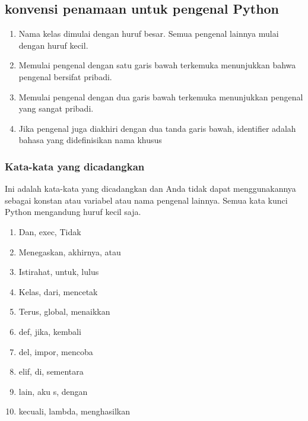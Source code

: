 \subsection{konvensi penamaan untuk pengenal Python}
\begin{enumerate}
    \item Nama kelas dimulai dengan huruf besar. Semua pengenal lainnya mulai dengan huruf kecil.
    \item Memulai pengenal dengan satu garis bawah terkemuka menunjukkan bahwa pengenal bersifat pribadi.
    \item Memulai pengenal dengan dua garis bawah terkemuka menunjukkan pengenal yang sangat pribadi.
    \item Jika pengenal juga diakhiri dengan dua tanda garis bawah, identifier adalah bahasa yang didefinisikan nama khusus
\end{enumerate}

\subsubsection{Kata-kata yang dicadangkan}
Ini adalah kata-kata yang dicadangkan dan Anda tidak dapat menggunakannya sebagai konstan atau variabel 
atau nama pengenal lainnya. Semua kata kunci Python mengandung huruf kecil saja.
\begin{enumerate}
    \item Dan, exec, Tidak
    \item Menegaskan, akhirnya, atau
    \item Istirahat, untuk, lulus
    \item Kelas, dari, mencetak
    \item Terus, global, menaikkan
    \item def, jika, kembali
    \item del, impor, mencoba
    \item elif, di, sementara
    \item lain, aku s, dengan
    \item kecuali, lambda, menghasilkan
    \end{enumerate}

